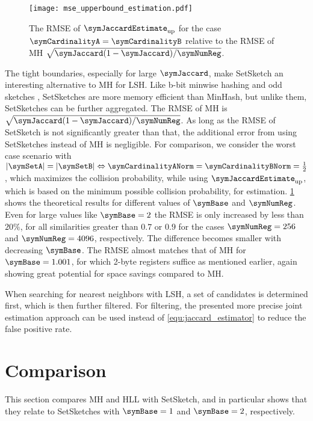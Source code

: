 \documentclass[sigconf, nonacm]{acmart}
\begin{document}
\begin{figure}[t]
  \centering
  \texttt{[image: mse\_upperbound\_estimation.pdf]}
  \caption{\boldmath The \acs*{RMSE} of $\symJaccardEstimate_\textnormal{\normalfont up}$ for the case $\symCardinalityA = \symCardinalityB$ relative to the \acs*{RMSE} of \acs*{MH} $\sqrt{\symJaccard(1-\symJaccard)/\symNumReg}$.}
  \label{fig:mse_upperbound_estimation.pdf}
\end{figure}


The tight boundaries, especially for large $\symJaccard$, make SetSketch an interesting alternative to \ac{MH} for \ac{LSH}. Like b-bit minwise hashing \cite{Li2010} and odd sketches \cite{Mitzenmacher2014}, SetSketches are more memory efficient than MinHash, but unlike them, SetSketches can be further aggregated. The \ac{RMSE} of \ac{MH} is $\sqrt{\symJaccard(1-\symJaccard)/\symNumReg}$. 
As long as the \ac{RMSE} of SetSketch is not significantly greater than that, the additional error from using SetSketches instead of \ac{MH} is negligible. For comparison, we consider the worst case scenario with $|\symSetA|=|\symSetB|\Leftrightarrow \symCardinalityANorm = \symCardinalityBNorm = \frac{1}{2}$, which maximizes the collision probability, while using $\symJaccardEstimate_\textnormal{up}$, which is based on the minimum possible collision probability, for estimation.
\cref{fig:mse_upperbound_estimation.pdf} shows the theoretical results for different values of $\symBase$ and $\symNumReg$. Even for large values like $\symBase=2$ the \ac{RMSE} is only increased by less than $20\%$, for all similarities greater than $0.7$ or $0.9$ for the cases $\symNumReg=256$ and $\symNumReg=4096$, respectively. The difference becomes smaller with decreasing $\symBase$. The \ac{RMSE} almost matches that of \ac{MH} for $\symBase=1.001$, for which 2-byte registers suffice as mentioned earlier, again showing great potential for space savings compared to \ac{MH}.

When searching for nearest neighbors with \ac{LSH}, a set of candidates is determined first, which is then further filtered. For filtering, the presented more precise joint estimation approach can be used instead of \eqref{equ:jaccard_estimator} to reduce the false positive rate.

\section{Comparison}
This section compares \ac{MH} and \ac{HLL} with SetSketch, and in particular shows that they relate to SetSketches with $\symBase=1$ and $\symBase=2$, respectively. 
\end{document}
